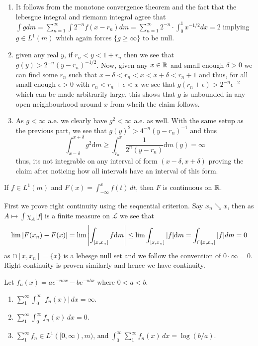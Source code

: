 \documentclass[12pt,a4paper]{article}
\begin{document}
\begin{solution}
\begin{enumerate}[label=\alph*.]
\item It follows from the monotone convergence theorem and the fact that the lebesgue integral and riemann integral agree that $\int gdm=\sum_{n=1}^\infty\int 2^{-n}f(x-r_n)dm=\sum_{n=1}^\infty2^{-n}\cdot \int_0^1x^{-1/2}dx=2$ implying $g\in L^1(m)$ which again forces $\{g\geq\infty\}$ to be null.
\item given any real $y$, if $r_n<y<1+r_n$ then we see that $g(y)>2^{-n}(y-r_n)^{-1/2}$. Now, given any $x\in\mathbb{R}$ and small enough $\delta>0$ we can find some $r_n$ such that $x-\delta<r_n<x<x+\delta<r_n+1$ and thus, for all small enough $\epsilon>0$ with $r_n<r_n+\epsilon<x$ we see that $g(r_n+\epsilon)>2^{-n}\epsilon^{-2}$ which can be made arbitrarily large, this shows that $g$ is unbounded in any open neighbourhood around $x$ from whcih the claim follows.
\item As $g<\infty$ a.e. we clearly have $g^2<\infty$ a.e. as well. With the same setup as the previous part, we see that $g(y)^2>4^{-n}(y-r_n)^{-1}$ and thus 
	\[
		\int_{x-\delta}^{x+\delta}g^2\mathrm{d}m\geq\int_{r_n}^{x} \frac{1}{2^n(y-r_n)} \mathrm{d}m(y) = \infty
	\]
thus, its not integrable on any interval of form $(x-\delta,x+\delta)$ proving the claim after noticing how all intervals have an interval of this form.
	
\end{enumerate}
\end{solution}
\begin{problem}\label{prob:2-26}
If $f \in L^1(m)$ and $F(x) = \int_{-\infty}^x f(t) \, dt$, then $F$ is continuous on $\mathbb{R}$.
\end{problem}
\begin{solution}
	First we prove right continuity using the sequential criterion. Say $x_n\searrow x$, then as $A\mapsto\int\chi_A|f|$ is a finite measure on $\mathcal L$ we see that 
	\[
		\lim\qty|F(x_n)-F(x)|=\lim\qty| \int_{[x,x_n]}f\mathrm{d}m|\leq\lim\int_{[x,x_n]}|f|\mathrm{d}m=\int_{\cap[x,x_n]}|f|dm=0
	\]
	as $\cap[x,x_n]=\{x\}$ is a lebesge null set and we follow the convention of $0\cdot\infty=0$. Right continuity is proven similarly and hence we have continuity.
\end{solution}
\begin{problem}\label{prob:2-27}
Let $f_n(x) = ae^{-nax} - be^{-nbx}$ where $0 < a < b$.
\begin{enumerate}[label=\alph*.]
    \item $\sum_1^\infty \int_0^\infty |f_n(x)| \, dx = \infty$.
    \item $\sum_1^\infty \int_0^\infty f_n(x) \, dx = 0$.
    \item $\sum_1^\infty f_n \in L^1([0, \infty), m)$, and $\int_0^\infty \sum_1^\infty f_n(x) \, dx = \log(b/a)$.
\end{enumerate}
\end{problem}
\end{document}
